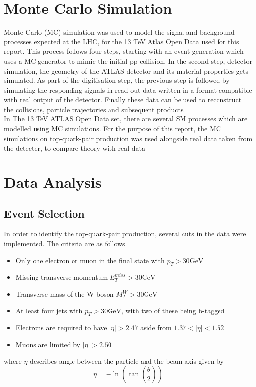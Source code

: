 \documentclass[11pt,a4paper]{article}
\begin{document}

\section{Monte Carlo Simulation}
Monte Carlo (MC) simulation was used to model the signal and background
processes expected at the LHC, for the 13 TeV Atlas Open Data used for this
report. This process follows four steps, starting with an event generation which
uses a MC generator to mimic the initial pp collision. In the second step,
detector simulation, the geometry of the ATLAS detector and its material
properties gets simulated. As part of the digitisation step, the previous step
is followed by simulating the responding signals in read-out data written in a
format compatible with real output of the detector. Finally these data can be
used to reconstruct the collisions, particle trajectories and subsequent products.\\

In The 13 TeV ATLAS Open Data set, there are several SM processes which are
modelled using MC simulations. For the purpose of this report, the MC
simulations on top-quark-pair production was used alongside real data taken from
the detector, to compare theory with real data.

\section{Data Analysis}
\subsection{Event Selection}
In order to identify the top-quark-pair production, several cuts in the data were implemented. The criteria are as follows 
\begin{itemize}
	\item Only one electron or muon in the final state with $p_{T} > 30 \mathrm{GeV}$
	\item Missing transverse momentum $E_{T}^{miss} > 30 \mathrm{GeV}$
	\item Transverse mass of the W-boson $M_{T}^{W} > 30 \mathrm{GeV}$
	\item At least four jets with $p_{T} > 30 \mathrm{GeV}$, with two of these being b-tagged
	\item Electrons are required to have $|\eta| > 2.47$ aside from $1.37 < |\eta| < 1.52$
	\item Muons are limited by $|\eta| > 2.50$
\end{itemize}
where $\eta$ describes angle between the particle and the beam axis given by 
\begin{equation}
	\eta = -\ln({\tan\left(\frac{\theta}{2}\right)})
\end{equation}
\end{document}
